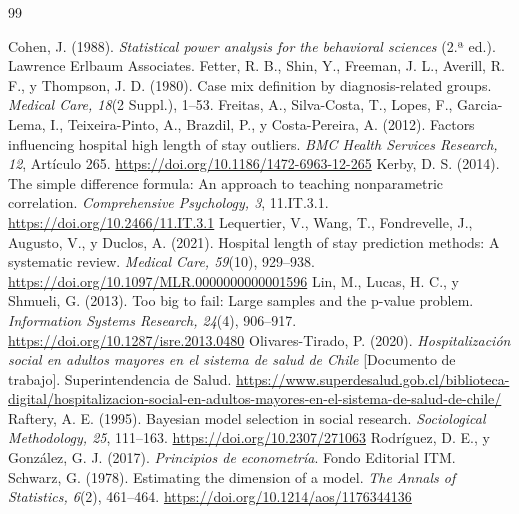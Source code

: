\documentclass[10.5pt,a4paper,headings=small,abstract=false]{scrartcl}
\begin{document}
\begin{thebibliography}{99}\small\raggedright\setlength{\itemsep}{0.25em}
 Cohen, J. (1988). \emph{Statistical power analysis for the behavioral sciences} (2.ª ed.). Lawrence Erlbaum Associates.
 Fetter, R. B., Shin, Y., Freeman, J. L., Averill, R. F., y Thompson, J. D. (1980). Case mix definition by diagnosis-related groups. \emph{Medical Care, 18}(2 Suppl.), 1--53.
 Freitas, A., Silva-Costa, T., Lopes, F., Garcia-Lema, I., Teixeira-Pinto, A., Brazdil, P., y Costa-Pereira, A. (2012). Factors influencing hospital high length of stay outliers. \emph{BMC Health Services Research, 12}, Artículo 265. \url{https://doi.org/10.1186/1472-6963-12-265}
 Kerby, D. S. (2014). The simple difference formula: An approach to teaching nonparametric correlation. \emph{Comprehensive Psychology, 3}, 11.IT.3.1. \url{https://doi.org/10.2466/11.IT.3.1}
 Lequertier, V., Wang, T., Fondrevelle, J., Augusto, V., y Duclos, A. (2021). Hospital length of stay prediction methods: A systematic review. \emph{Medical Care, 59}(10), 929--938. \url{https://doi.org/10.1097/MLR.0000000000001596}
 Lin, M., Lucas, H. C., y Shmueli, G. (2013). Too big to fail: Large samples and the p-value problem. \emph{Information Systems Research, 24}(4), 906--917. \url{https://doi.org/10.1287/isre.2013.0480}
 Olivares-Tirado, P. (2020). \emph{Hospitalización social en adultos mayores en el sistema de salud de Chile} [Documento de trabajo]. Superintendencia de Salud. \url{https://www.superdesalud.gob.cl/biblioteca-digital/hospitalizacion-social-en-adultos-mayores-en-el-sistema-de-salud-de-chile/}
 Raftery, A. E. (1995). Bayesian model selection in social research. \emph{Sociological Methodology, 25}, 111--163. \url{https://doi.org/10.2307/271063}
 Rodríguez, D. E., y González, G. J. (2017). \emph{Principios de econometría}. Fondo Editorial ITM.
 Schwarz, G. (1978). Estimating the dimension of a model. \emph{The Annals of Statistics, 6}(2), 461--464. \url{https://doi.org/10.1214/aos/1176344136}
\end{thebibliography}
\end{document}
